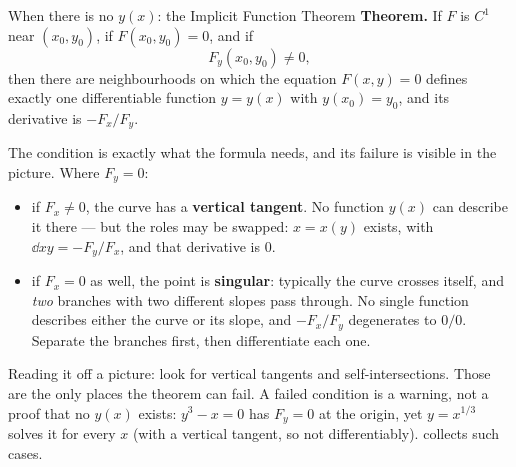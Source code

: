 \begin{gallery}
\hfill
{}
\end{gallery}

\begin{rulebox}{When there is no $y(x)$: the Implicit Function Theorem}
\textbf{Theorem.} If $F$ is $C^{1}$ near $(x_{0},y_{0})$, if
$F(x_{0},y_{0})=0$, and if
\[
  F_{y}(x_{0},y_{0})\neq0 ,
\]
then there are neighbourhoods on which the equation $F(x,y)=0$ defines
exactly one differentiable function $y=y(x)$ with $y(x_{0})=y_{0}$, and its
derivative is $-F_{x}/F_{y}$.

The condition is exactly what the formula needs, and its failure is
visible in the picture. Where $F_{y}=0$:
\begin{itemize}[leftmargin=1.6em,itemsep=0.3ex]
  \item if $F_{x}\neq0$, the curve has a \textbf{vertical tangent}. No
        function $y(x)$ can describe it there --- but the roles may be
        swapped: $x=x(y)$ exists, with
        $\dd{x}{y}=-F_{y}/F_{x}$, and that derivative is $0$.
  \item if $F_{x}=0$ as well, the point is \textbf{singular}: typically the
        curve crosses itself, and \emph{two} branches with two different
        slopes pass through. No single function describes either the curve
        or its slope, and $-F_{x}/F_{y}$ degenerates to $0/0$. Separate the
        branches first, then differentiate each one.
\end{itemize}
Reading it off a picture: look for vertical tangents and self-intersections.
Those are the only places the theorem can fail. A failed condition is a
warning, not a proof that no $y(x)$ exists: $y^{3}-x=0$ has $F_{y}=0$ at the
origin, yet $y=x^{1/3}$ solves it for every $x$ (with a vertical tangent, so
not differentiably).  collects such cases.
\end{rulebox}

